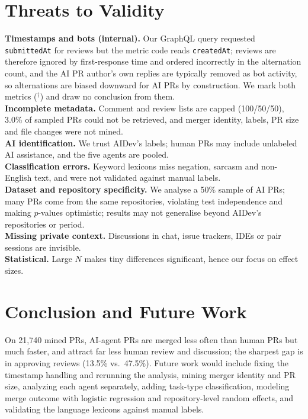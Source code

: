 \documentclass[conference]{IEEEtran}
\begin{document}
\section{Threats to Validity}
\textbf{Timestamps and bots (internal).} Our GraphQL query requested \texttt{submittedAt} for reviews but the metric code reads \texttt{createdAt}; reviews are therefore ignored by first-response time and ordered incorrectly in the alternation count, and the AI PR author's own replies are typically removed as bot activity, so alternations are biased downward for AI PRs by construction. We mark both metrics ($^\dagger$) and draw no conclusion from them. \\
\textbf{Incomplete metadata.} Comment and review lists are capped (100/50/50), 3.0\% of sampled PRs could not be retrieved, and merger identity, labels, PR size and file changes were not mined. \\
\textbf{AI identification.} We trust AIDev's labels; human PRs may include unlabeled AI assistance, and the five agents are pooled. \\
\textbf{Classification errors.} Keyword lexicons miss negation, sarcasm and non-English text, and were not validated against manual labels. \\
\textbf{Dataset and repository specificity.} We analyse a 50\% sample of AI PRs; many PRs come from the same repositories, violating test independence and making $p$-values optimistic; results may not generalise beyond AIDev's repositories or period. \\
\textbf{Missing private context.} Discussions in chat, issue trackers, IDEs or pair sessions are invisible. \\
\textbf{Statistical.} Large $N$ makes tiny differences significant, hence our focus on effect sizes. \\

\section{Conclusion and Future Work}
On 21{,}740 mined PRs, AI-agent PRs are merged less often than human PRs but much faster, and attract far less human review and discussion; the sharpest gap is in approving reviews (13.5\% vs.\ 47.5\%). Future work would include fixing the timestamp handling and rerunning the analysis, mining merger identity and PR size, analyzing each agent separately, adding task-type classification, modeling merge outcome with logistic regression and repository-level random effects, and validating the language lexicons against manual labels.
\end{document}
